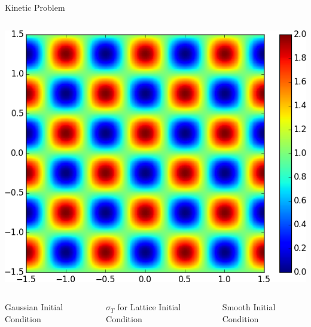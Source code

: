 \documentclass{beamer}
\begin{document}
\begin{frame}{Kinetic Problem}
\begin{columns}
            \centering
            \includegraphics[width=\textwidth]{initcond_smooth.png}
        \end{columns}
        \begin{columns}
            \centering
            Gaussian Initial Condition

            \centering
            $\sigma_T$ for Lattice Initial Condition

            \centering
            Smooth Initial Condition
        \end{columns}
    \end{frame}
\end{document}

